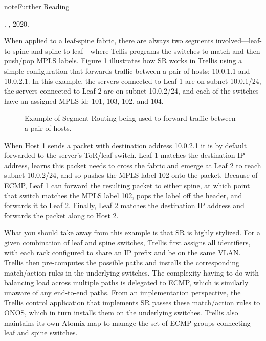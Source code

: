 \documentclass[letterpaper,11pt,english]{sphinxmanual}
\let\sphinxpxdimen\pdfpxdimen\else\newdimen\sphinxpxdimen
\begin{document}
\label{\detokenize{trellis:reading-mpls}}
\begin{sphinxadmonition}{note}{Further Reading}

. , 2020.
\end{sphinxadmonition}

When applied to a leaf-spine fabric, there are always two segments
involved—leaf-to-spine and spine-to-leaf—where Tellis programs the
switches to match and then push/pop MPLS labels.  \hyperref[\detokenize{trellis:fig-sr}]{Figure \ref{\detokenize{trellis:fig-sr}}} illustrates how SR works in Trellis using a simple
configuration that forwards traffic between a pair of hosts: 10.0.1.1
and 10.0.2.1. In this example, the servers connected to Leaf 1 are on
subnet 10.0.1/24, the servers connected to Leaf 2 are on subnet
10.0.2/24, and each of the switches have an assigned MPLS id: 101,
103, 102, and 104.

\begin{figure}[htbp]
\centering
\capstart

\noindent\sphinxincludegraphics[width=400\sphinxpxdimen]{{Slide32}.png}
\caption{Example of Segment Routing being used to forward traffic between a
pair of hosts.}\label{\detokenize{trellis:id2}}\label{\detokenize{trellis:fig-sr}}\end{figure}

When Host 1 sends a packet with destination address 10.0.2.1 it is by
default forwarded to the server’s ToR/leaf switch. Leaf 1 matches the
destination IP address, learns this packet needs to cross the fabric
and emerge at Leaf 2 to reach subnet 10.0.2/24, and so pushes the MPLS
label 102 onto the packet. Because of ECMP, Leaf 1 can forward the
resulting packet to either spine, at which point that switch matches
the MPLS label 102, pops the label off the header, and forwards it to
Leaf 2.  Finally, Leaf 2 matches the destination IP address and
forwards the packet along to Host 2.

What you should take away from this example is that SR is highly
stylized. For a given combination of leaf and spine switches, Trellis
first assigns all identifiers, with each rack configured to share an
IP prefix and be on the same VLAN. Trellis then pre-computes the
possible paths and installs the corresponding match/action rules in
the underlying switches. The complexity having to do with balancing
load across multiple paths is delegated to ECMP, which is similarly
unaware of any end-to-end paths. From an implementation perspective,
the Trellis control application that implements SR passes these
match/action rules to ONOS, which in turn installs them on the
underlying switches. Trellis also maintains its own Atomix map to
manage the set of ECMP groups connecting leaf and spine switches.
\end{document}
